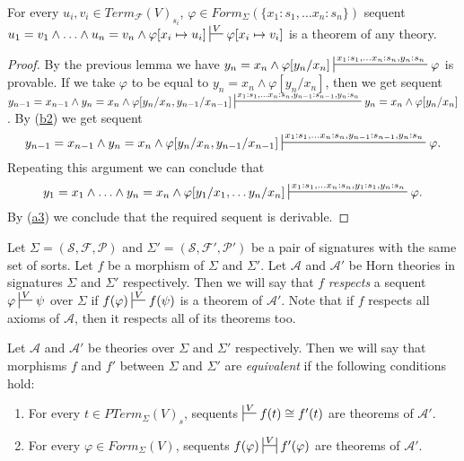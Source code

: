 \documentclass[reqno]{amsart}
\newcommand{\axref}[1]{(\hyperref[ax:#1]{#1})}
\theoremstyle{definition}
\theoremstyle{remark}
\numberwithin{figure}{section}
\begin{document}
\begin{lem}[cong-b]
For every $u_i,v_i \in Term_\mathcal{F}(V)_{s_i}$, $\varphi \in Form_\Sigma(\{ x_1 : s_1, \ldots x_n : s_n\})$
sequent $u_1 = v_1 \land \ldots \land u_n = v_n \land \varphi[x_i \mapsto u_i] \sststile{}{V} \varphi[x_i \mapsto v_i]$ is a theorem of any theory.
\end{lem}
\begin{proof}
By the previous lemma we have $y_n = x_n \land \varphi[y_n/x_n] \sststile{}{x_1 : s_1, \ldots x_n : s_n, y_n : s_n} \varphi$ is provable.
If we take $\varphi$ to be equal to $y_n = x_n \land \varphi[y_n/x_n]$, then we get sequent
$y_{n-1} = x_{n-1} \land y_n = x_n \land \varphi[y_n/x_n,y_{n-1}/x_{n-1}] \sststile{}{x_1 : s_1, \ldots x_n : s_n, y_{n-1} : s_{n-1}, y_n : s_n} y_n = x_n \land \varphi[y_n/x_n]$.
By \axref{b2} we get sequent
\[ y_{n-1} = x_{n-1} \land y_n = x_n \land \varphi[y_n/x_n,y_{n-1}/x_{n-1}] \sststile{}{x_1 : s_1, \ldots x_n : s_n, y_{n-1} : s_{n-1}, y_n : s_n} \varphi. \]
Repeating this argument we can conclude that
\[ y_1 = x_1 \land \ldots \land y_n = x_n \land \varphi[y_1/x_1, \ldots y_n/x_n] \sststile{}{x_1 : s_1, \ldots x_n : s_n, y_1 : s_1, y_n : s_n} \varphi. \]
By \axref{a3} we conclude that the required sequent is derivable.
\end{proof}

Let $\Sigma = (\mathcal{S}, \mathcal{F}, \mathcal{P})$ and $\Sigma' = (\mathcal{S}, \mathcal{F}', \mathcal{P}')$ be a pair of signatures with the same set of sorts.
Let $f$ be a morphism of $\Sigma$ and $\Sigma'$.
Let $\mathcal{A}$ and $\mathcal{A}'$ be Horn theories in signatures $\Sigma$ and $\Sigma'$ respectively.
Then we will say that $f$ \emph{respects} a sequent $\varphi \sststile{}{V} \psi$ over $\Sigma$ if $f(\varphi) \sststile{}{V} f(\psi)$ is a theorem of $\mathcal{A}'$.
Note that if $f$ respects all axioms of $\mathcal{A}$, then it respects all of its theorems too.

Let $\mathcal{A}$ and $\mathcal{A}'$ be theories over $\Sigma$ and $\Sigma'$ respectively.
Then we will say that morphisms $f$ and $f'$ between $\Sigma$ and $\Sigma'$ are \emph{equivalent} if the following conditions hold:
\begin{enumerate}
\item For every $t \in PTerm_\Sigma(V)_s$, sequents $\sststile{}{V} f(t) \cong f'(t)$ are theorems of $\mathcal{A}'$.
\label{mor-eq-a}
\item For every $\varphi \in Form_\Sigma(V)$, sequents $f(\varphi) \ssststile{}{V} f'(\varphi)$ are theorems of $\mathcal{A}'$.
\label{mor-eq-b}
\end{enumerate}
\end{document}
